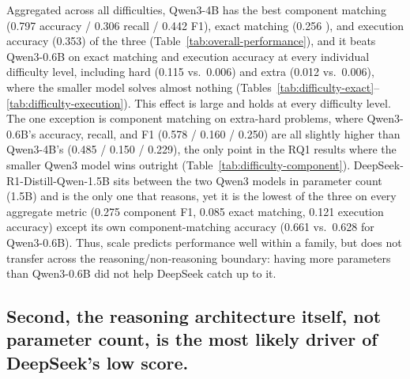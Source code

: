 Aggregated across all difficulties, Qwen3-4B has the best component matching (0.797 accuracy / 0.306 recall / 0.442 F1), exact matching (0.256 ), and execution accuracy (0.353) of the three (Table~\ref{tab:overall-performance}), and it beats Qwen3-0.6B on exact matching and execution accuracy at every individual difficulty level, including hard (0.115 vs.\ 0.006) and extra (0.012 vs.\ 0.006), where the smaller model solves almost nothing (Tables~\ref{tab:difficulty-exact}--\ref{tab:difficulty-execution}). This effect is large and holds at every difficulty level. The one exception is component matching on extra-hard problems, where Qwen3-0.6B's accuracy, recall, and F1 (0.578 / 0.160 / 0.250) are all slightly higher than Qwen3-4B's (0.485 / 0.150 / 0.229), the only point in the RQ1 results where the smaller Qwen3 model wins outright (Table~\ref{tab:difficulty-component}). DeepSeek-R1-Distill-Qwen-1.5B sits between the two Qwen3 models in parameter count (1.5B) and is the only one that reasons, yet it is the lowest of the three on every aggregate metric (0.275 component F1, 0.085 exact matching, 0.121 execution accuracy) except its own component-matching accuracy (0.661 vs.\ 0.628 for Qwen3-0.6B). Thus, scale predicts performance well within a family, but does not transfer across the reasoning/non-reasoning boundary: having more parameters than Qwen3-0.6B did not help DeepSeek catch up to it.

\subsection{Second, the reasoning architecture itself, not parameter count, is the most likely driver of DeepSeek's low score.}
\label{sec:rq1-finding-reasoning}

